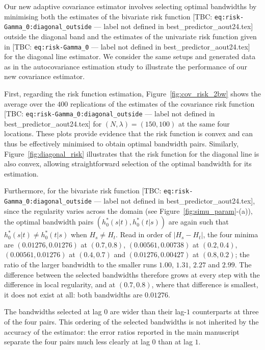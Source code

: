 \color{magenta}
Our new adaptive covariance estimator involves selecting optimal bandwidths by minimising both the estimates of the bivariate risk function [TBC: \texttt{eq:risk-Gamma\_0:diagonal\_outside} --- label not defined in best\_predictor\_aout24.tex] outside the diagonal band and the estimates of the univariate risk function given in [TBC: \texttt{eq:risk-Gamma\_0} --- label not defined in best\_predictor\_aout24.tex] for the diagonal line estimator. We consider the same setups and generated data as in the autocovariance estimation study to illustrate the performance of our new covariance estimator.
\color{black}

\color{magenta}
First, regarding the risk function estimation, Figure~\ref{fig:cov_risk_2bw} shows the average over the $400$ replications of the estimates of the covariance risk function [TBC: \texttt{eq:risk-Gamma\_0:diagonal\_outside} --- label not defined in best\_predictor\_aout24.tex] for $(N, \lambda) = (150, 100)$ at the same four locations. These plots provide evidence that the risk function is convex and can thus be effectively minimised to obtain optimal bandwidth pairs. Similarly, Figure~\ref{fig:diagonal_risk} illustrates that the risk function for the diagonal line is also convex, allowing straightforward selection of the optimal bandwidth for its estimation.
\color{black}

\color{magenta}
Furthermore, for the bivariate risk function [TBC: \texttt{eq:risk-Gamma\_0:diagonal\_outside} --- label not defined in best\_predictor\_aout24.tex], since the regularity varies across the domain (see Figure~\ref{fig:simu_param}-(a)), the optimal bandwidth pairs $(h_0^*(s|t), h_0^*(t|s))$ are again such that $h_0^*(s|t) \neq h_0^*(t|s)$ when $H_s \neq H_t$. Read in order of $|H_s - H_t|$, the four minima are $(0.01276, 0.01276)$ at $(0.7, 0.8)$, $(0.00561, 0.00738)$ at $(0.2, 0.4)$, $(0.00561, 0.01276)$ at $(0.4, 0.7)$ and $(0.01276, 0.00427)$ at $(0.8, 0.2)$; the ratio of the larger bandwidth to the smaller runs $1.00$, $1.31$, $2.27$ and $2.99$. The difference between the selected bandwidths therefore grows at every step with the difference in local regularity, and at $(0.7, 0.8)$, where that difference is smallest, it does not exist at all: both bandwidths are $0.01276$.

The bandwidths selected at lag $0$ are wider than their lag-$1$ counterparts at three of the four pairs. This ordering of the selected bandwidths is not inherited by the accuracy of the estimator: the error ratios reported in the main manuscript separate the four pairs much less clearly at lag $0$ than at lag $1$.
\color{black}

